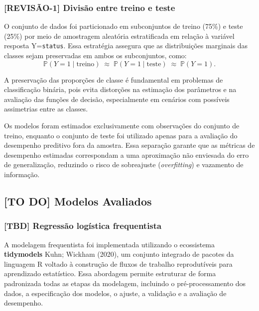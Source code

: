 \documentclass[
  brazilian,
  12pt,
  letterpaper,
  DIV=11,
  numbers=noendperiod]{scrartcl}
\begin{document}
\subsubsection{{[}REVISÃO-1{]} Divisão entre treino e
teste}\label{revisuxe3o-1-divisuxe3o-entre-treino-e-teste}

O conjunto de dados foi particionado em subconjuntos de treino (75\%) e
teste (25\%) por meio de amostragem aleatória estratificada em relação à
variável resposta Y=\texttt{status}. Essa estratégia assegura que as
distribuições marginais das classes sejam preservadas em ambos os
subconjuntos, como:
\begin{equation}
\mathbb{P}(Y = 1 \mid \text{treino})
\;\approx\;
\mathbb{P}(Y = 1 \mid \text{teste})
\;\approx\;
\mathbb{P}(Y = 1).
\label{eq:eq-treino-teste}
\end{equation}

A preservação das proporções de classe é fundamental em problemas de
classificação binária, pois evita distorções na estimação dos parâmetros
e na avaliação das funções de decisão, especialmente em cenários com
possíveis assimetrias entre as classes.

Os modelos foram estimados exclusivamente com observações do conjunto de
treino, enquanto o conjunto de teste foi utilizado apenas para a
avaliação do desempenho preditivo fora da amostra. Essa separação
garante que as métricas de desempenho estimadas correspondam a uma
aproximação não enviesada do erro de generalização, reduzindo o risco de
sobreajuste (\emph{overfitting}) e vazamento de informação.

\subsection{{[}TO DO{]} Modelos
Avaliados}\label{to-do-modelos-avaliados}

\subsubsection{{[}TBD{]} Regressão logística
frequentista}\label{tbd-regressuxe3o-loguxedstica-frequentista}

A modelagem frequentista foi implementada utilizando o ecossistema
\textbf{tidymodels} Kuhn; Wickham (2020), um conjunto integrado de
pacotes da linguagem R voltado à construção de fluxos de trabalho
reprodutíveis para aprendizado estatístico. Essa abordagem permite
estruturar de forma padronizada todas as etapas da modelagem, incluindo
o pré-processamento dos dados, a especificação dos modelos, o ajuste, a
validação e a avaliação de desempenho.
\end{document}
